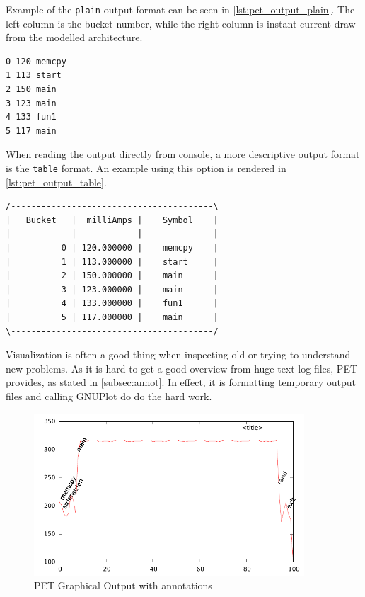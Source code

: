 Example of the \texttt{plain} output format can be seen in
\autoref{lst:pet_output_plain}. The left column is the bucket number, while the
right column is instant current draw from the modelled architecture.

\begin{lstlisting}[float=hbt,label={lst:pet_output_plain},caption={PET Plain Output with annotations}]
0 120 memcpy
1 113 start
2 150 main
3 123 main
4 133 fun1
5 117 main
\end{lstlisting}

When reading the output directly from console, a more descriptive output format
is the \texttt{table} format. An example using this option is rendered in
\autoref{lst:pet_output_table}.

\begin{lstlisting}[float=hbt,label={lst:pet_output_table},caption={PET Table Output with annotations}]
/----------------------------------------\
|   Bucket   |  milliAmps |    Symbol    |
|------------|------------|--------------|
|          0 | 120.000000 |    memcpy    |
|          1 | 113.000000 |    start     |
|          2 | 150.000000 |    main      |
|          3 | 123.000000 |    main      |
|          4 | 133.000000 |    fun1      |
|          5 | 117.000000 |    main      |
\----------------------------------------/
\end{lstlisting}

Visualization is often a good thing when inspecting old or trying to understand
new problems. As it is hard to get a good overview from huge text log files, PET
provides, as stated in \autoref{subsec:annot}. In effect, it is formatting
temporary output files and calling GNUPlot do do the hard work.

\begin{figure}[htb]
    \centering
    \includegraphics[width=0.9\textwidth]{figs/annot.pdf}
    \caption{PET Graphical Output with annotations}
    \label{fig:annot}
\end{figure}

